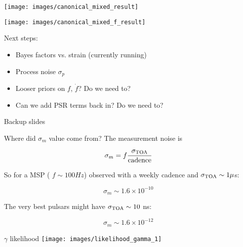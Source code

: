 \documentclass[10pt]{beamer}
\begin{document}
\begin{frame}
		\texttt{[image: images/canonical\_mixed\_result]}
\end{frame}



\begin{frame}
	\texttt{[image: images/canonical\_mixed\_f\_result]}
\end{frame}



\begin{frame}
	Next steps:
	\begin{itemize}
		\item Bayes factors vs. strain (currently running)
		\item Process noise $\sigma_p$
		\item Looser priors on $f$, $\dot{f}$? Do we need to?
		\item Can we add PSR terms back in? Do we need to?
	\end{itemize}
\end{frame}


\begin{frame}[standout]
	Backup slides
\end{frame}

\appendix


\begin{frame}[fragile]{Where did $\sigma_m$ value come from?}
The measurement noise is

$$ \sigma_m = f \frac{\sigma_{\rm TOA}}{\rm cadence}$$

So for a MSP ( $f \sim 100 Hz$) observed with a weekly cadence and $\sigma_{\rm TOA} \sim 1 \mu$s:


$$\sigma_m \sim 1.6 \times 10^{-10}$$

The very best pulsars might have $\sigma_{\rm TOA} \sim 10$ ns:

$$\sigma_m \sim 1.6 \times 10^{-12}$$
\end{frame}







\begin{frame}{$\gamma$ likelihood}
	\texttt{[image: images/likelihood\_gamma\_1]}
\end{frame}
\end{document}
